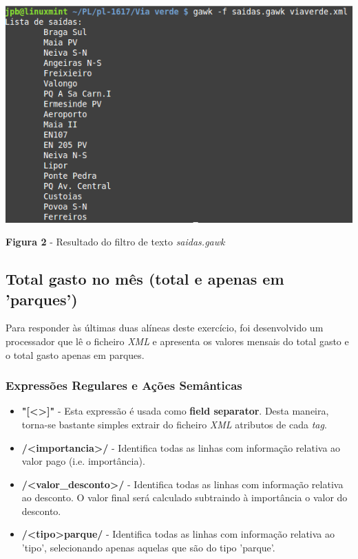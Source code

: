 \documentclass{article}
\begin{document}
\begin{center}
    \includegraphics[scale=1]{imagens/saidas}
    \caption{\textbf{Figura 2} - Resultado do filtro de texto \emph{saidas.gawk}}
\end{center}

\subsection{Total gasto no mês (total e apenas em 'parques')}

Para responder às últimas duas alíneas deste exercício, foi desenvolvido um processador que lê o ficheiro \emph{XML} e apresenta os valores mensais do total gasto e o total gasto apenas em parques.

\subsubsection{Expressões Regulares e Ações Semânticas}

\begin{itemize}
    \item \textbf{"[\textless\textgreater]"} - Esta expressão é usada como \textbf{field separator}. Desta maneira, torna-se bastante simples extrair do ficheiro \emph{XML} atributos de cada \emph{tag}.
    \item \textbf{/\textless importancia\textgreater/} - Identifica todas as linhas com informação relativa ao valor pago (i.e. importância).
    \item \textbf{/\textless valor\_desconto\textgreater/} - Identifica todas as linhas com informação relativa ao desconto. O valor final será calculado subtraindo à importância o valor do desconto.
    \item \textbf{/\textless tipo\textgreater parque/} - Identifica todas as linhas com informação relativa ao 'tipo', selecionando apenas aquelas que são do tipo 'parque'.
\end{itemize}
\end{document}

